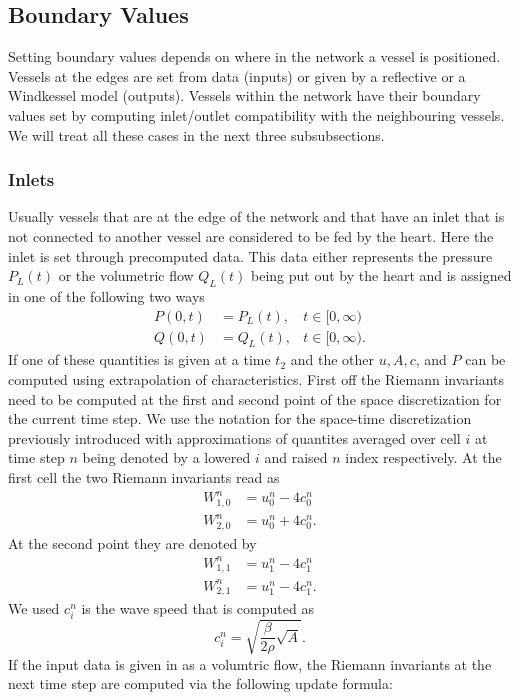 \documentclass[a4paper, oneside]{discothesis}
\begin{document}
\subsection{Boundary Values} \label{ssec:boundary_values}
Setting boundary values depends on where in the network a vessel is positioned.
Vessels at the edges are set from data (inputs) or given by a reflective or a Windkessel model (outputs).
Vessels within the network have their boundary values set by computing inlet/outlet compatibility with the neighbouring vessels.
We will treat all these cases in the next three subsubsections.

\subsubsection{Inlets}\label{sssec:inlets}
Usually vessels that are at the edge of the network and that have an inlet that is not connected to another vessel are considered to be fed by the heart.
Here the inlet is set through precomputed data.
This data either represents the pressure $P_L(t)$ or the volumetric flow $Q_L(t)$ being put out by the heart and is assigned in one of the following two ways
\begin{align}
	P(0,t) &= P_L(t), &t \in [0,\infty) \\
	Q(0,t) &= Q_L(t), &t \in [0,\infty).
\end{align}
If one of these quantities is given at a time $t_2$ and the other $u, A, c$, and $P$ can be computed using extrapolation of characteristics.
First off the Riemann invariants need to be computed at the first and second point of the space discretization for the current time step.
We use the notation for the space-time discretization previously introduced with approximations of quantites averaged over cell $i$ at time step $n$ being denoted by a lowered $i$ and raised $n$ index respectively.
At the first cell the two Riemann invariants read as
\begin{align}
	W_{1,0}^n &= u^n_0 - 4c^n_0\\
	W_{2,0}^n &= u^n_0 + 4c^n_0.
\end{align}
At the second point they are denoted by
\begin{align}
	W_{1,1}^n &= u^n_1 - 4c^n_1\\
	W_{2,1}^n &= u^n_1 - 4c^n_1.
\end{align}
We used $c_i^n$ is the wave speed that is computed as
\begin{equation}
	c^n_i = \sqrt{\frac{\beta}{2\rho}\sqrt{A}}.
\end{equation}
If the input data is given in as a volumtric flow, the Riemann invariants at the next time step are computed via the following update formula:
\end{document}

